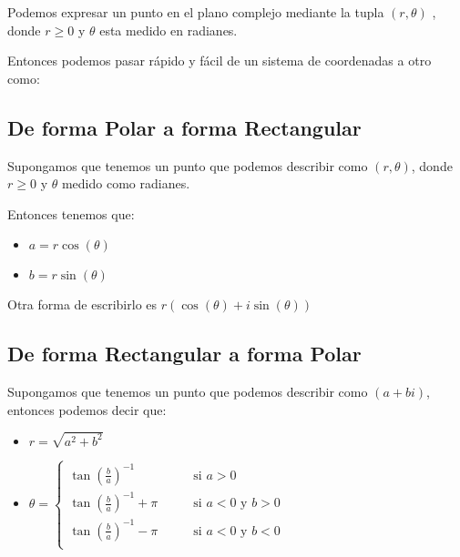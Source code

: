\documentclass[12pt, fleqn]{report}                             %
\DeclareMathOperator \Space {\quad}                             %
\newcommand{\Wrap}[1]{\left( #1 \right)}                        %
\newcommand{\Cos}[1]{\cos\Wrap{#1}}                             %
\newcommand{\Sin}[1]{\sin\Wrap{#1}}                             %
\begin{document}
            Podemos expresar un punto en el plano complejo mediante la tupla $(r, \theta)$ , donde
            $r \geq 0$ y $\theta$ esta medido en radianes.

            Entonces podemos pasar rápido y fácil de un sistema de coordenadas a otro como:

            \subsection{De forma Polar a forma Rectangular}

                Supongamos que tenemos un punto que podemos describir como $(r, \theta)$,
                donde $r \geq 0$ y $\theta$ medido como radianes.

                Entonces tenemos que:

                \begin{itemize}
                     \item $a = r \Cos{\theta}$
                     \item $b = r \Sin{\theta}$
                 \end{itemize}

                 Otra forma de escribirlo es $r(\Cos{\theta} + i\Sin{\theta})$

            \subsection{De forma Rectangular a forma Polar}

                Supongamos que tenemos un punto que podemos describir como $(a+bi)$,
                entonces podemos decir que:

                \begin{itemize}
                    \item $r = \sqrt{a^2+b^2}$
                    \item $\theta = \begin{cases}
                                        \tan(\frac{b}{a})^{-1}      \Space &\text{ si } a > 0                   \\
                                        \tan(\frac{b}{a})^{-1} +\pi \Space &\text{ si } a < 0 \text{ y } b > 0  \\
                                        \tan(\frac{b}{a})^{-1} -\pi \Space &\text{ si } a < 0 \text{ y } b < 0  \\
                                    \end{cases}$
                \end{itemize}
\end{document}
